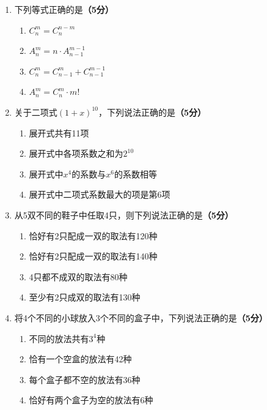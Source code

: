 \documentclass[12pt, a4paper]{ctexart}
\newcommand{\score}[1]{\hfill\textbf{（#1分）}}
\begin{document}
\begin{enumerate}[label=\textbf{\arabic*.}, leftmargin=2em, resume]

\item 下列等式正确的是\score{5}
\begin{enumerate}[label=\Alph*., leftmargin=2em]
\item $C_n^m = C_n^{n-m}$
\item $A_n^m = n \cdot A_{n-1}^{m-1}$
\item $C_n^m = C_{n-1}^m + C_{n-1}^{m-1}$
\item $A_n^m = C_n^m \cdot m!$
\end{enumerate}

\item 关于二项式$(1+x)^{10}$，下列说法正确的是\score{5}
\begin{enumerate}[label=\Alph*., leftmargin=2em]
\item 展开式共有11项
\item 展开式中各项系数之和为$2^{10}$
\item 展开式中$x^4$的系数与$x^6$的系数相等
\item 展开式中二项式系数最大的项是第6项
\end{enumerate}

\item 从5双不同的鞋子中任取4只，则下列说法正确的是\score{5}
\begin{enumerate}[label=\Alph*., leftmargin=2em]
\item 恰好有2只配成一双的取法有120种
\item 恰好有2只配成一双的取法有140种
\item 4只都不成双的取法有80种
\item 至少有2只成双的取法有130种
\end{enumerate}

\item 将4个不同的小球放入3个不同的盒子中，下列说法正确的是\score{5}
\begin{enumerate}[label=\Alph*., leftmargin=2em]
\item 不同的放法共有$3^4$种
\item 恰有一个空盒的放法有42种
\item 每个盒子都不空的放法有36种
\item 恰好有两个盒子为空的放法有6种
\end{enumerate}

\end{enumerate}

\vspace{0.5cm}
\end{document}
